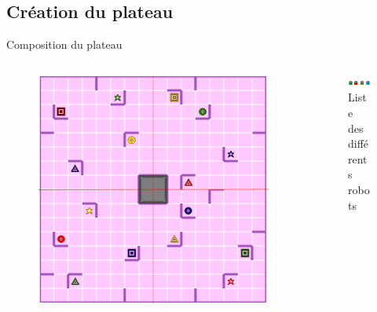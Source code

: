 \documentclass{beamer}
\begin{document}
    \subsection{Création du plateau}
        \begin{frame}{Composition du plateau}
            \begin{columns}
                \begin{column}{6cm}
                    \begin{figure}
                        \centering
                        \includegraphics[scale=0.2]{images/plateau.png}
                    \end{figure}
                \end{column}
                \begin{column}{6cm}
                    \begin{figure}
                        \centering
                        \includegraphics[scale=0.4]{images/listeRobots.png}
                        \caption{Liste des différents robots}
                    \end{figure}
                    \begin{figure}

\end{figure}
\end{column}
\end{columns}
\end{frame}
\end{document}

